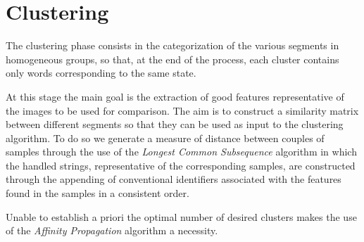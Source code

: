 \section{Clustering}
\label{Nostro_prog}
The clustering phase consists in the categorization of the various segments in homogeneous groups, so that, at the end of the process, each cluster contains only words corresponding to the same state.

At this stage the main goal is the extraction of good features representative of the images to be used for comparison. The aim is to construct a similarity matrix between different segments so that they can be used as input to the clustering algorithm. To do so we generate a measure of distance between couples of samples through the use of the \emph{Longest Common Subsequence} algorithm in which the handled strings, representative of the corresponding samples, are constructed through the appending of conventional identifiers associated with the features found in the samples in a consistent order. 

Unable to establish a priori the optimal number of desired clusters makes the use of the \emph{Affinity Propagation} algorithm a necessity.

